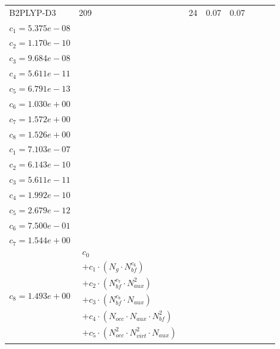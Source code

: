 \begin{longtable}{|p{1.7cm}|p{1.2cm}|p{1.1cm}|p{1.4cm}|p{1.3cm}|p{3.0cm}|p{3.0cm}|p{4.8cm}|}
\hline
B2PLYP-D3 & 209 & 24 & 0.07 & 0.07 & \begin{tabular}{l}\(c_{0}=9.990e-01\) \\ \(c_{1}=5.375e-08\) \\ \(c_{2}=1.170e-10\) \\ \(c_{3}=9.684e-08\) \\ \(c_{4}=5.611e-11\) \\ \(c_{5}=6.791e-13\) \\ \(c_{6}=1.030e+00\) \\ \(c_{7}=1.572e+00\) \\ \(c_{8}=1.526e+00\)\end{tabular} & \begin{tabular}{l}\(c_{0}=6.621e-01\) \\ \(c_{1}=7.103e-07\) \\ \(c_{2}=6.143e-10\) \\ \(c_{3}=5.611e-11\) \\ \(c_{4}=1.992e-10\) \\ \(c_{5}=2.679e-12\) \\ \(c_{6}=7.500e-01\) \\ \(c_{7}=1.544e+00\) \\ \(c_{8}=1.493e+00\)\end{tabular} & $\begin{array}{l}c_{0} \\ + c_{1}  \cdot  (N_{g}  \cdot  N_{bf} ^{c_{6}}) \\ + c_{2}  \cdot  (N_{bf} ^{c_{7}}  \cdot  N_{aux} ^{2}) \\ + c_{3}  \cdot  (N_{bf} ^{c_{8}}  \cdot  N_{aux}) \\ + c_{4}  \cdot  (N_{occ}  \cdot  N_{aux}  \cdot  N_{bf} ^{2}) \\ + c_{5}  \cdot  (N_{occ} ^{2}  \cdot  N_{virt} ^{2}  \cdot  N_{aux})\end{array}$ \\ 
\hline
\end{longtable}
